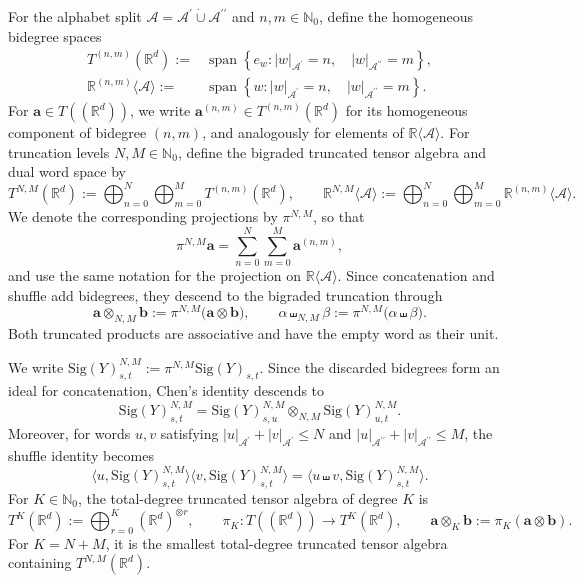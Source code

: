 \documentclass{amsart}
\theoremstyle{definition}
\theoremstyle{remark}
\newcommand{\Sig}[1]{\mathrm{Sig}(#1)}
\begin{document}
For the alphabet split
$\mathcal{A}
=
\mathcal{A}^{\prime}
\mathbin{\dot\cup}
\mathcal{A}^{\prime\prime}$
and $n,m\in\mathbb{N}_0$, define the homogeneous bidegree spaces
\begin{align*}
     T^{(n,m)}(\mathbb{R}^{d})
    :=&
    \operatorname{span}
    \left\{
        e_w:
        |w|_{\mathcal{A}^{\prime}}=n,
        \quad
        |w|_{\mathcal{A}^{\prime\prime}}=m
    \right\},
    \\
    \mathbb{R}^{(n,m)}\langle\mathcal{A}\rangle
    :=&
    \operatorname{span}
    \left\{
        w:
        |w|_{\mathcal{A}^{\prime}}=n,
        \quad
        |w|_{\mathcal{A}^{\prime\prime}}=m
    \right\}.
\end{align*}
For $\mathbf{a}\in T((\mathbb{R}^{d}))$, we write
$\mathbf{a}^{(n,m)}\in T^{(n,m)}(\mathbb{R}^{d})$ for its homogeneous
component of bidegree $(n,m)$, and analogously for elements of
$\mathbb{R}\langle\mathcal{A}\rangle$.
For truncation levels $N,M\in\mathbb{N}_0$, define the bigraded truncated
tensor algebra and dual word space by
\[
    T^{N,M}(\mathbb{R}^{d})
    :=
    \bigoplus_{n=0}^{N}
    \bigoplus_{m=0}^{M}
    T^{(n,m)}(\mathbb{R}^{d}),
    \qquad
    \mathbb{R}^{N,M}\langle\mathcal{A}\rangle
    :=
    \bigoplus_{n=0}^{N}
    \bigoplus_{m=0}^{M}
    \mathbb{R}^{(n,m)}\langle\mathcal{A}\rangle.
\]
We denote the corresponding projections by $\pi^{N,M}$, so that
\[
    \pi^{N,M}\mathbf{a}
    =
    \sum_{n=0}^{N}
    \sum_{m=0}^{M}
    \mathbf{a}^{(n,m)},
\]
and use the same notation for the projection on
$\mathbb{R}\langle\mathcal{A}\rangle$.
Since concatenation and shuffle add bidegrees, they descend to the bigraded
truncation through
\[
    \mathbf{a}\otimes_{N,M}\mathbf{b}
    :=
    \pi^{N,M}
    \bigl(
        \mathbf{a}\otimes\mathbf{b}
    \bigr),
    \qquad
    \alpha\shuffle_{N,M}\beta
    :=
    \pi^{N,M}
    \bigl(
        \alpha\shuffle\beta
    \bigr).
\]
Both truncated products are associative and have the empty word as their
unit.

We write
$\Sig{Y}^{N,M}_{s,t}
:=
\pi^{N,M}\Sig{Y}_{s,t}$. Since the discarded bidegrees form an ideal for
concatenation, Chen's identity descends to
\[
    \Sig{Y}^{N,M}_{s,t}
    =
    \Sig{Y}^{N,M}_{s,u}
    \otimes_{N,M}
    \Sig{Y}^{N,M}_{u,t}.
\]
Moreover, for words $u,v$ satisfying
$|u|_{\mathcal{A}^{\prime}}+|v|_{\mathcal{A}^{\prime}}\leq N$ and
$|u|_{\mathcal{A}^{\prime\prime}}+|v|_{\mathcal{A}^{\prime\prime}}\leq M$,
the shuffle identity becomes
\[
    \big\langle u,\Sig{Y}^{N,M}_{s,t}\big\rangle
    \big\langle v,\Sig{Y}^{N,M}_{s,t}\big\rangle
    =
    \big\langle
        u\shuffle v,
        \Sig{Y}^{N,M}_{s,t}
    \big\rangle.
\]
For $K\in\mathbb{N}_0$, the total-degree truncated tensor algebra of degree
$K$ is
\[
    T^K(\mathbb{R}^{d})
    :=
    \bigoplus_{r=0}^K(\mathbb{R}^{d})^{\otimes r},
    \qquad
    \pi_K
    \colon
    T((\mathbb{R}^{d}))
    \to
    T^K(\mathbb{R}^{d}),
    \qquad
    \mathbf{a}\otimes_K\mathbf{b}
    :=
    \pi_K(\mathbf{a}\otimes\mathbf{b}).
\]
For $K=N+M$, it is the smallest total-degree truncated tensor algebra
containing $T^{N,M}(\mathbb{R}^{d})$.
\end{document}
